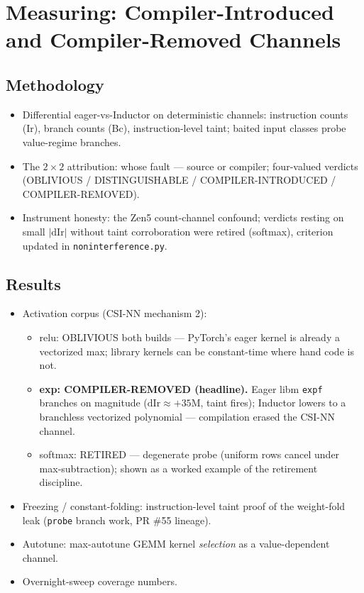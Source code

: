 \section{Measuring: Compiler-Introduced and Compiler-Removed Channels}


\subsection{Methodology}
\begin{itemize}
  \item Differential eager-vs-Inductor on deterministic channels: instruction
    counts (Ir), branch counts (Bc), instruction-level taint; baited input
    classes probe value-regime branches.
  \item The $2{\times}2$ attribution: whose fault --- source or compiler;
    four-valued verdicts (OBLIVIOUS / DISTINGUISHABLE / COMPILER-INTRODUCED /
    COMPILER-REMOVED).
  \item Instrument honesty: the Zen5 count-channel confound; verdicts resting
    on small $|\mathrm{dIr}|$ without taint corroboration were retired
    (softmax), criterion updated in \texttt{noninterference.py}.
\end{itemize}

\subsection{Results}
\begin{itemize}
  \item Activation corpus (CSI-NN mechanism 2):
    \begin{itemize}
      \item relu: OBLIVIOUS both builds --- PyTorch's eager kernel is already a
        vectorized max; library kernels can be constant-time where hand code
        is not.
      \item \textbf{exp: COMPILER-REMOVED (headline).} Eager libm \texttt{expf}
        branches on magnitude ($\mathrm{dIr} \approx +35\mathrm{M}$, taint
        fires); Inductor lowers to a branchless vectorized polynomial ---
        compilation erased the CSI-NN channel.
      \item softmax: RETIRED --- degenerate probe (uniform rows cancel under
        max-subtraction); shown as a worked example of the retirement
        discipline.
    \end{itemize}
  \item Freezing / constant-folding: instruction-level taint proof of the
    weight-fold leak (\texttt{probe} branch work, PR \#55 lineage).
  \item Autotune: max-autotune GEMM kernel \emph{selection} as a
    value-dependent channel.
  \item Overnight-sweep coverage numbers.
\end{itemize}
